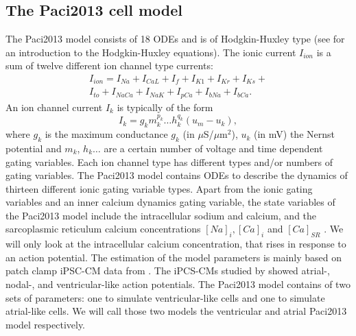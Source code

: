 \documentclass[12pt,a4paper]{article}
\begin{document}
\subsection{The Paci2013 cell model} \label{The Paci2013 cell model}
The Paci2013 model consists of 18 ODEs and is of Hodgkin-Huxley type (see \cite[p. 195-215]{KeenerI} for an introduction to the Hodgkin-Huxley equations). The ionic current $I_{ion}$ is a sum of twelve different ion channel type currents:
\begin{eqnarray}
I_{ion}=I_{Na}+I_{CaL}+I_f+I_{K1}+I_{Kr}+I_{Ks}+ \\
I_{to}+I_{NaCa}+I_{NaK}+I_{pCa}+I_{bNa}+I_{bCa}.
\end{eqnarray}
An ion channel current $I_k$ is typically of the form 
\begin{equation}
I_{k}=g_k m_k^{p_k}\ldots h_k^{q_k}(u_m-u_k),
\end{equation}
where $g_k$ is the maximum conductance $g_k$ (in $\mu$S/$\mu$m$^2$), $u_k$ (in mV) the Nernst potential and $m_k$, $h_k \ldots$ are a certain number of voltage and time dependent gating variables. Each ion channel type has different types and/or numbers of gating variables. The Paci2013 model contains ODEs to describe the dynamics of thirteen different ionic gating variable types. Apart from the ionic gating variables and an inner calcium dynamics gating variable, the state variables of the Paci2013 model include the intracellular sodium and calcium, and the sarcoplasmic reticulum calcium concentrations $[Na]_i, [Ca]_i$ and $[Ca]_{SR}$ \cite{Paci2013}. We will only look at the intracellular calcium concentration, that rises in response to an action potential. The estimation of the model parameters is mainly based on patch clamp iPSC-CM data from \cite{Ma2011}. The iPCS-CMs studied by \cite{Ma2011} showed atrial-, nodal-, and ventricular-like action potentials. The Paci2013 model contains of two sets of parameters: one to simulate ventricular-like cells and one to simulate atrial-like cells. We will call those two models the ventricular and atrial Paci2013 model respectively.
%
%
\\
\end{document}
